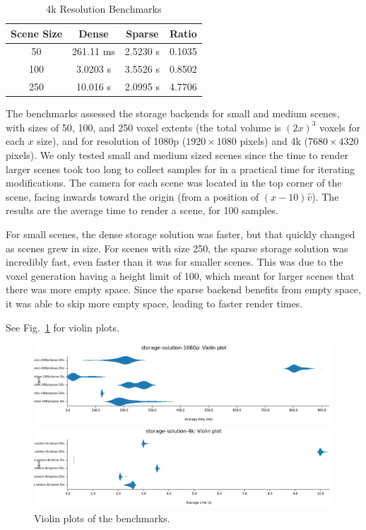 \documentclass[conference]{IEEEtran}
\begin{document}
\begin{table}[htbp]
\caption{4k Resolution Benchmarks}
\begin{center}
\begin{tabular}{|c|c|c|c|}
\hline
\textbf{Scene Size} & \textbf{Dense} & \textbf{Sparse}  & \textbf{Ratio} \\\hline 
50 & 261.11 ms & 2.5230 s & 0.1035 \\\hline
100 & 3.0203 s & 3.5526 s & 0.8502 \\\hline
250 & 10.016 s & 2.0995 s & 4.7706 \\\hline
\end{tabular}
\label{4k-bench}
\end{center}
\end{table}

The benchmarks assessed the storage backends for small and medium scenes, with sizes of 50, 100, and 250 voxel extents (the total volume is $(2x)^3$ voxels for each $x$ size), and for resolution of 1080p ($1920 \times 1080$ pixels) and 4k ($7680 \times 4320$ pixels).
We only tested small and medium sized scenes since the time to render larger scenes took too long to collect samples for in a practical time for iterating modifications.
The camera for each scene was located in the top corner of the scene, facing inwards toward the origin (from a position of $(x-10)\hat{v}$).
The results are the average time to render a scene, for 100 samples.

For small scenes, the dense storage solution was faster, but that quickly changed as scenes grew in size.
For scenes with size 250, the sparse storage solution was incredibly fast, even faster than it was for smaller scenes.
This was due to the voxel generation having a height limit of 100, which meant for larger scenes that there was more empty space.
Since the sparse backend benefits from empty space, it was able to skip more empty space, leading to faster render times.

See Fig.~\ref{violin} for violin plots.

\begin{figure}[htbp]
\centerline{\includegraphics[width=\linewidth]{violin-1080p}}
\centerline{\includegraphics[width=\linewidth]{violin-4k}}
\caption{Violin plots of the benchmarks.}
\label{violin}
\end{figure}
\end{document}
